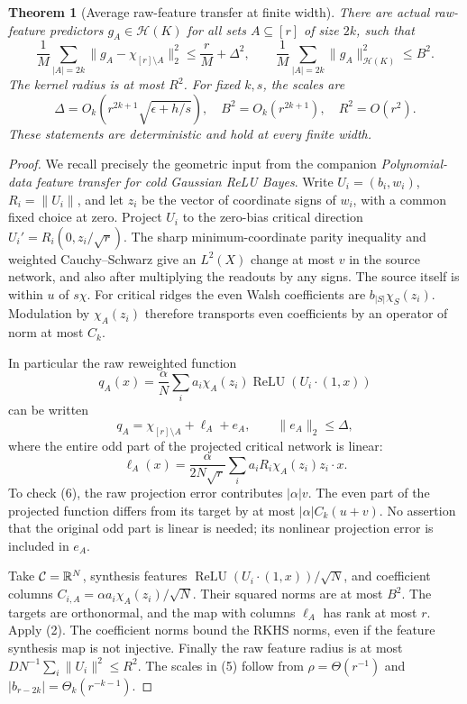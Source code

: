 \documentclass[11pt]{article}
\newtheorem{theorem}{Theorem}\newtheorem{lemma}[theorem]{Lemma}
\newcommand{\relu}{\operatorname{ReLU}}
\begin{document}
\begin{theorem}[Average raw-feature transfer at finite width]
There are actual raw-feature predictors $g_A\in\mathcal H(K)$ for
all sets $A\subseteq[r]$ of size $2k$, such that
\[
 \frac1M\sum_{|A|=2k}\|g_A-\chi_{[r]\setminus A}\|_2^2
       \le\frac rM+\Delta^2,
 \qquad
 \frac1M\sum_{|A|=2k}\|g_A\|_{\mathcal H(K)}^2\le B^2.
 \tag{4}
\]
The kernel radius is at most $R^2$. For fixed $k,s$, the scales are
\[
 \Delta=O_k(r^{2k+1}\sqrt{\epsilon+h/s}),\quad
 B^2=O_k(r^{2k+1}),\quad R^2=O(r^2).
 \tag{5}
\]
These statements are deterministic and hold at every finite width.
\end{theorem}
\begin{proof}
We recall precisely the geometric input from the companion
\emph{Polynomial-data feature transfer for cold Gaussian ReLU Bayes}.
Write $U_i=(b_i,w_i)$, $R_i=\|U_i\|$, and let $z_i$ be the vector of
coordinate signs of $w_i$, with a common fixed choice at zero.
Project $U_i$ to the zero-bias critical direction
$U_i'=R_i(0,z_i/\sqrt r)$. The sharp minimum-coordinate parity
inequality and weighted Cauchy--Schwarz give an $L^2(X)$ change at most
$v$ in the source network, and also after multiplying the readouts by
any signs. The source itself is within $u$ of $s\chi$.
For critical ridges the even Walsh coefficients are
$b_{|S|}\chi_S(z_i)$. Modulation by $\chi_A(z_i)$ therefore transports
even coefficients by an operator of norm at most $C_k$.

In particular the raw reweighted function
\[
 q_A(x)=\frac{\alpha}{N}\sum_i a_i\chi_A(z_i)
                                      \relu(U_i\cdot(1,x))
\]
can be written
\[
 q_A=\chi_{[r]\setminus A}+\ell_A+e_A,
 \qquad \|e_A\|_2\le\Delta,
 \tag{6}
\]
where the entire odd part of the projected critical network is linear:
\[
 \ell_A(x)=\frac{\alpha}{2N\sqrt r}
                         \sum_i a_iR_i\chi_A(z_i)z_i\cdot x.
\]
To check (6), the raw projection error contributes $|\alpha|v$.
The even part of the projected function differs from its target by at
most $|\alpha|C_k(u+v)$. No assertion that the original odd part is
linear is needed; its nonlinear projection error is included in $e_A$.

Take $\mathcal C=\mathbb R^N$, synthesis features
$\relu(U_i\cdot(1,x))/\sqrt N$, and coefficient columns
$C_{i,A}=\alpha a_i\chi_A(z_i)/\sqrt N$.
Their squared norms are at most $B^2$. The targets are orthonormal,
and the map with columns $\ell_A$ has rank at most $r$.
Apply (2). The coefficient norms bound the RKHS norms, even if the
feature synthesis map is not injective. Finally the raw feature radius
is at most $D N^{-1}\sum_i\|U_i\|^2\le R^2$.
The scales in (5) follow from $\rho=\Theta(r^{-1})$ and
$|b_{r-2k}|=\Theta_k(r^{-k-1})$.
\end{proof}
\end{document}
